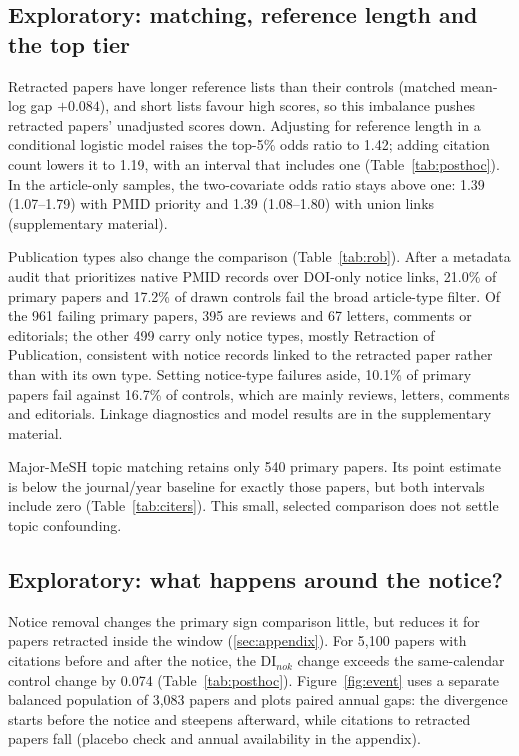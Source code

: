 \subsection{Exploratory: matching, reference length and the top tier}
Retracted papers have longer reference lists than their controls (matched mean-log gap $+0.084$), and short
lists favour high scores, so this imbalance pushes retracted papers' unadjusted scores down. Adjusting for reference
length in a conditional logistic model raises the top-5\% odds ratio to 1.42; adding citation count lowers it to
1.19, with an interval that includes one (Table~\ref{tab:posthoc}). In the article-only samples, the two-covariate
odds ratio stays above one: 1.39 (1.07--1.79) with PMID priority and 1.39 (1.08--1.80) with union links
(supplementary material).

Publication types also change the comparison (Table~\ref{tab:rob}). After a metadata audit that prioritizes native PMID records over DOI-only notice links, 21.0\% of primary
papers and 17.2\% of drawn controls fail the broad article-type filter.
Of the 961 failing primary papers, 395 are reviews and 67 letters, comments or editorials; the other 499 carry
only notice types, mostly Retraction of Publication, consistent with notice records linked to the retracted
paper rather than with its own type. Setting notice-type failures aside, 10.1\% of primary papers fail against
16.7\% of controls, which are mainly reviews, letters, comments and editorials.
Linkage diagnostics and model results are in the supplementary material.

Major-MeSH topic matching retains only 540 primary papers. Its point estimate is below the journal/year baseline
for exactly those papers, but both intervals include zero (Table~\ref{tab:citers}).
This small, selected comparison does not settle topic confounding.

\subsection{Exploratory: what happens around the notice?}
Notice removal changes the primary sign comparison little, but reduces it for papers retracted inside the window
(\ref{sec:appendix}). For 5,100 papers with citations before and after the notice, the DI$_{nok}$ change exceeds
the same-calendar control change by 0.074 (Table~\ref{tab:posthoc}).
Figure~\ref{fig:event} uses a separate balanced population of 3,083 papers and plots paired annual gaps:
the divergence starts before the notice and steepens afterward, while citations to retracted papers fall
(placebo check and annual availability in the appendix).


